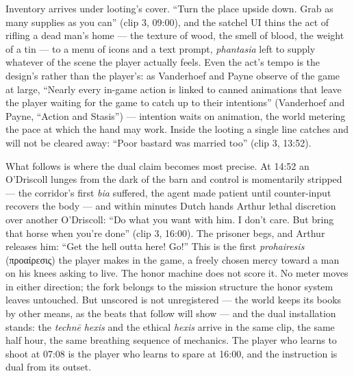 \documentclass{article}
\newcommand{\gk}[1]{{\greekfont #1}}
\begin{document}
Inventory arrives under looting's cover. ``Turn the place upside down. Grab as many supplies as you can'' (clip 3, 09:00), and the satchel UI thins the act of rifling a dead man's home — the texture of wood, the smell of blood, the weight of a tin — to a menu of icons and a text prompt, \textit{phantasia} left to supply whatever of the scene the player actually feels.
Even the act's tempo is the design's rather than the player's: as Vanderhoef and Payne observe of the game at large, ``Nearly every in-game action is linked to canned animations that leave the player waiting for the game to catch up to their intentions'' (Vanderhoef and Payne, ``Action and Stasis'') — intention waits on animation, the world metering the pace at which the hand may work. Inside the looting a single line catches and will not be cleared away: ``Poor bastard was married too'' (clip 3, 13:52).

What follows is where the dual claim becomes most precise. At 14:52 an O'Driscoll lunges from the dark of the barn and control is momentarily stripped — the corridor's first \textit{bia} suffered, the agent made patient until counter-input recovers the body — and within minutes Dutch hands Arthur lethal discretion over another O'Driscoll: ``Do what you want with him. I don't care. But bring that horse when you're done'' (clip 3, 16:00). The prisoner begs, and Arthur releases him: ``Get the hell outta here! Go!'' This is the first \textit{prohairesis} (\gk{προαίρεσις}) the player makes in the game, a freely chosen mercy toward a man on his knees asking to live. The honor machine does not score it. No meter moves in either direction; the fork belongs to the mission structure the honor system leaves untouched. But unscored is not unregistered — the world keeps its books by other means, as the beats that follow will show — and the dual installation stands: the \textit{technē} \textit{hexis} and the ethical \textit{hexis} arrive in the same clip, the same half hour, the same breathing sequence of mechanics. The player who learns to shoot at 07:08 is the player who learns to spare at 16:00, and the instruction is dual from its outset.
\end{document}

